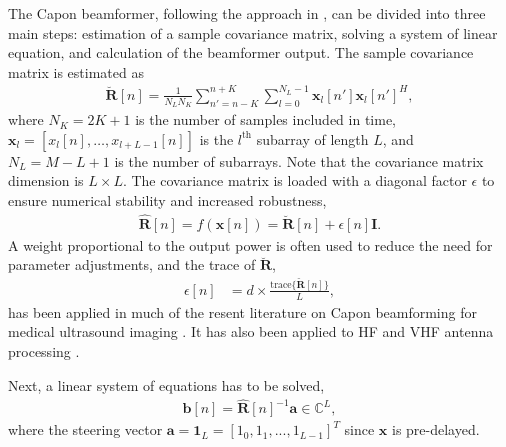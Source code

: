 \documentclass[journal]{IEEEtran}
\newcommand{\mat}[1]{\mathbf{#1}}
\renewcommand{\vec}[1]{\mathbf{#1}}
\begin{document}
The Capon beamformer, following the approach in \cite{Synnevag2009}, can be divided into three main steps: estimation of a sample covariance matrix, solving a system of linear equation, and calculation of the beamformer output.  The sample covariance matrix is estimated as 
\begin{align}
\mat{\breve{R}}[n] = \frac{1}{N_LN_K}\sum_{n'=n-K}^{n+K} \sum_{l=0}^{N_L-1} \vec{x}_l[n']\vec{x}_l[n']^H,\label{eq:R}
\end{align}
where  $N_K = 2K + 1$ is the number of samples included in time, $\vec{x}_l = [x_l[n], \dotso, x_{l+L-1}[n]]$ is the $l^\text{th}$ subarray of length $L$, and $N_L = M-L+1$ is the number of subarrays. Note that the covariance matrix dimension is $L \times L$. The covariance matrix is loaded with a diagonal factor $\epsilon$ to ensure numerical stability and increased robustness, 
\begin{align}\label{eq:diag}
\mat{\hat{R}}[n] =  f(\vec{x}[n]) = \mat{\breve{R}}[n] + \epsilon[n]\mat{I}.
\end{align}
A weight proportional to the output power is often used to reduce the need for parameter adjustments, and the trace of $\mat{\breve{R}}$, 
\begin{align}\label{eq:diag_adapt}
\epsilon[n] &= d \times \frac{\text{trace}\{\mat{\breve{R}}[n]\}}{L},
\end{align}
has been applied in much of the resent literature on Capon beamforming for medical ultrasound imaging \cite{Synnevag2007, Nilsen2009, Wang2009, Mehdizadeh2012}. It has also been applied to HF and VHF antenna processing \cite{Featherstone1997b}.

Next, a linear system of equations has to be solved,
\begin{align}\label{eq:b}
\vec{b}[n] = \mat{\hat{R}}[n]^{-1}\vec{a} \in \mathbb{C}^L,
\end{align}
where the steering vector $\vec{a} = \vec{1}_L = [1_0, 1_1, ..., 1_{L-1}]^T$ since $\vec{x}$ is pre-delayed. 
\end{document}
